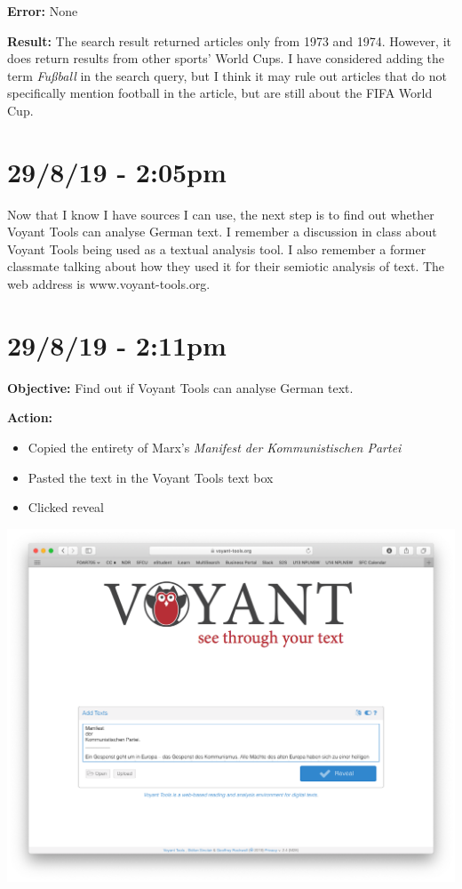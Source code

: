 \documentclass{article}
\begin{document}
\textbf{Error:} None

\textbf{Result:} The search result returned articles only from 1973 and 1974. However, it does return results from other sports' World Cups. I have considered adding the term \textit{Fußball} in the search query, but I think it may rule out articles that do not specifically mention football in the article, but are still about the FIFA World Cup.

\section*{29/8/19 - 2:05pm}

Now that I know I have sources I can use, the next step is to find out whether Voyant Tools can analyse German text. I remember a discussion in class about Voyant Tools being used as a textual analysis tool. I also remember a former classmate talking about how they used it for their semiotic analysis of text. The web address is www.voyant-tools.org.

\section*{29/8/19 - 2:11pm}

\textbf{Objective:} Find out if Voyant Tools can analyse German text.

\textbf{Action:}

\begin{itemize}
    \item Copied the entirety of Marx's \textit{Manifest der Kommunistischen Partei}
    \item Pasted the text in the Voyant Tools text box
    \item Clicked reveal
\end{itemize}

\includegraphics[width=\textwidth]{vtkommunismus.png}
\end{document}
